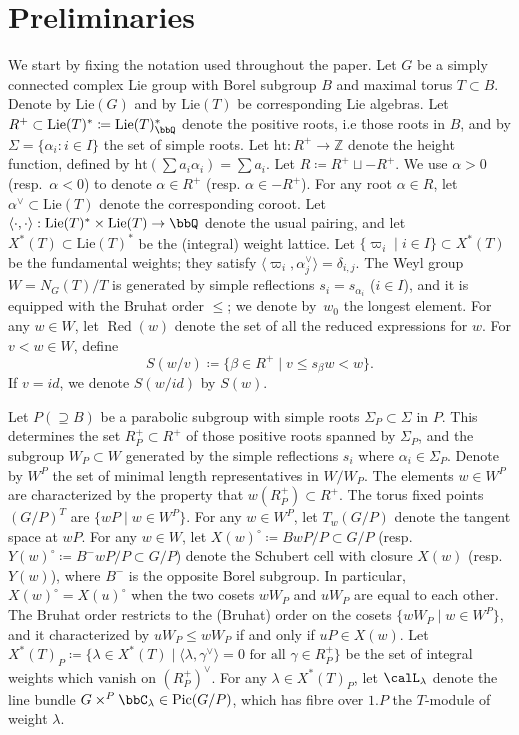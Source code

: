 \documentclass[11pt]{article}
\theoremstyle{definition}
\numberwithin{equation}{section}
\newcommand{\h}{\mathrm{ht}}
\DeclareMathOperator{\Pic}{Pic}
\DeclareMathOperator{\Red}{Red}
\begin{document}
\section{Preliminaries}\label{sec:prelims}
We start by fixing the notation used throughout the paper. Let $G$ be a simply connected complex 
Lie group with Borel subgroup $B$ and maximal torus $T\subset B$. Denote by 
$\mathrm{Lie}(G)$ and by 
$\mathrm{Lie}(T)$ 
be corresponding Lie algebras. Let 
$R^+\subset \mathrm{Lie}(T)^*\coloneqq \mathrm{Lie}(T)^*_\bbQ$
denote the positive roots, 
i.e those roots in $B$, and by $\Sigma =\{ \alpha_i: i \in I \}$ the set of simple roots. Let 
$\h: R^+ \to \mathbb{Z}$ 
denote the height function, defined by $\h(\sum a_i \alpha_i) = \sum a_i$. Let $R\coloneqq R^+\sqcup -R^+$. 
We use $\alpha>0$ (resp.~$\alpha<0$) to denote $\alpha\in R^+$ (resp. $\alpha\in -R^+$). For any 
root $\alpha\in R$, let 
$\alpha^\vee \subset \mathrm{Lie}(T)$
denote the corresponding coroot. Let~$\langle \cdot,\cdot \rangle: \mathrm{Lie}(T)^{*}\times \mathrm{Lie}(T)\to \bbQ$
denote the usual pairing, and let 
$X^*(T)\subset \mathrm{Lie}(T)^*$ 
be the (integral) weight lattice. 
Let $\{\varpi_i\mid i\in I\}\subset X^*(T)$ be the fundamental weights; they satisfy $\langle \varpi_i, \alpha_j^\vee \rangle = \delta_{i,j}$.
The Weyl group $W = N_G(T)/T$ is generated by simple reflections $s_i= s_{\alpha_i}$ ($i \in I$), and it is equipped with 
the Bruhat order $\leq$; we denote by~$w_0$ the longest element. For any $w\in W$, let $\Red(w)$ 
denote the set of all the reduced expressions for $w$. For $v < w \in W$, define 
\begin{equation}\label{equ:wvinversion}
	S(w/v)\coloneqq \{\beta\in R^+\mid v\le s_\beta w<w\}.
\end{equation}
If $v=id$, we denote $S(w/id)$ by $S(w)$.

Let $P (\supseteq B)$ be a parabolic subgroup with simple roots $\Sigma_P\subset \Sigma$ in $P$. This determines
the set $R_P^+ \subset R^+$ of those positive roots spanned by $\Sigma_P$, and the subgroup $W_P \subset W$ generated 
by the simple reflections $s_i$ where $\alpha_i \in \Sigma_P$. Denote by $W^P$ the set of 
minimal length representatives in $W/W_P$. The elements $w\in W^P$ are characterized by the property that $w(R^+_P)\subset R^+$. 
The torus fixed points $(G/P)^T$ are $\{wP\mid w\in W^P\}$. For any $w\in W^P$, let 
$T_w(G/P)$ denote the tangent space at $wP$. For any $w\in W$, let $X(w)^\circ\coloneqq BwP/P\subset G/P$ (resp. 
$Y(w)^\circ\coloneqq B^-wP/P\subset G/P$) denote the Schubert cell with closure $X(w)$ (resp. $Y(w)$), where 
$B^-$ is the opposite Borel subgroup. In particular, $X(w)^\circ=X(u)^\circ$ when the two cosets $wW_P$ and 
$uW_P$ are equal to each other. The Bruhat order restricts to the (Bruhat) order
on the cosets 
$\{wW_P\mid w\in W^P\}$, and it characterized by $uW_P\leq wW_P$ if and only if 
$uP\in X(w)$. Let $X^{*}(T)_P\coloneqq \{\lambda\in X^{*}(T)\mid \langle\lambda, \gamma^\vee\rangle=0 \text{ for all }
\gamma\in R^+_P \}$ be the set of integral weights which vanish on $ (R^+_P)^\vee$. For any 
$\lambda\in X^*(T)_P$, let $\calL_\lambda$ denote the line bundle $G\times^P\bbC_\lambda\in\Pic(G/P)$, which has 
fibre over $1.P$ the $T$-module of weight $\lambda$.
\end{document}
